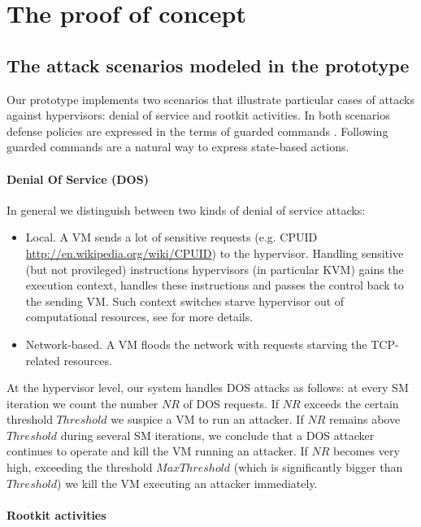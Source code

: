 
\section{\label{sec:The-prototype}The proof of concept}


\subsection{\label{sub:The-attack-scenarios}The attack scenarios modeled in
the prototype}

Our prototype implements two scenarios that illustrate particular
cases of attacks against hypervisors: denial of service and rootkit
activities. In both scenarios defense policies are expressed in the
terms of guarded commands \cite{Dijkstra:1975:Guarded}. Following
\cite{Dolev:2009:SPC:1552309.1552312} guarded commands are a natural
way to express state-based actions. 


\paragraph{Denial Of Service (DOS) }

In general we distinguish between two kinds of denial of service attacks:
\begin{itemize}
\item Local. A VM sends a lot of sensitive requests (e.g. CPUID \url{http://en.wikipedia.org/wiki/CPUID})
to the hypervisor. Handling sensitive (but not provileged) instructions
hypervisors (in particular KVM) gains the execution context, handles
these instructions and passes the control back to the sending VM.
Such context switches starve hypervisor out of computational resources,
see \cite{ddos-cpuid} for more details.
\item Network-based. A VM floods the network with requests starving the
TCP-related resources.
\end{itemize}
At the hypervisor level, our system handles DOS attacks as follows:
at every SM iteration we count the number $NR$ of DOS requests. If
$NR$ exceeds the certain threshold $Threshold$ we suspice a VM to
run an attacker. If $NR$ remains above $Threshold$ during several
SM iterations, we conclude that a DOS attacker continues to operate
and kill the VM running an attacker. If $NR$ becomes very high, exceeding
the threshold $MaxThreshold$ (which is significantly bigger than
$Threshold$) we kill the VM executing an attacker immediately.


\paragraph{Rootkit activities}

